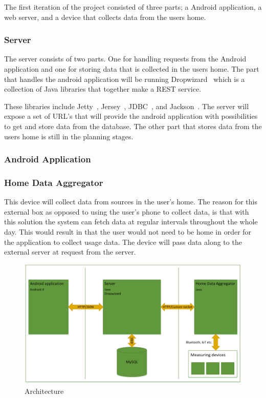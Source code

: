The first iteration of the project consisted of three parts; a Android application, a web server, and a device that collects data from the users home.

\subsubsection{Server}
The server consists of two parts. One for handling requests from the Android application and one for storing data that is collected in the users home. 
The part that handles the android application will be running Dropwizard~\cite{dropwizard} which is a collection of Java libraries that together make a REST service. 

These libraries include Jetty~\cite{jetty}, Jersey~\cite{jersey}, JDBC~\cite{jdbc}, and Jackson~\cite{jackson}. The server will expose a set of URL's that will provide the android application with 
possibilities to get and store data from the database. The other part that stores data from the users home is still in the planning stages.

\subsubsection{Android Application}

\subsubsection{Home Data Aggregator}
This device will collect data from sources in the user's home. The reason for this external box as opposed to using 
the user's phone to collect data, is that with this solution the system can fetch data at regular intervals throughout 
the whole day. This would result in that the user would not need to be home in order for the application to collect 
usage data. The device will pass data along to the external server at request from the server.

\begin{figure}[H]
\includegraphics[width=\textwidth]{ch/implementation/fig/architecture.png}
\caption{Architecture}
\end{figure}